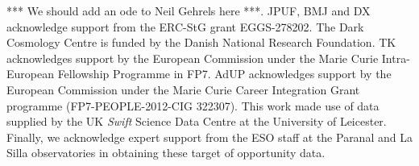 \documentclass{aa}    %
\begin{document}
\begin{acknowledgements}
*** We should add an ode to Neil Gehrels here ***.
JPUF, BMJ and DX acknowledge support from the ERC-StG grant EGGS-278202.  The
Dark Cosmology Centre is funded by the Danish National Research Foundation.  TK
acknowledges support by the European Commission under the Marie Curie
Intra-European Fellowship Programme in FP7.  AdUP acknowledges support by the
European Commission under the Marie Curie Career Integration Grant programme
(FP7-PEOPLE-2012-CIG 322307).  This work made use of data supplied by the UK
{\it Swift} Science Data Centre at the University of Leicester.  Finally, we
acknowledge expert support from the ESO staff at the Paranal and La Silla
observatories in obtaining these target of opportunity data.

\end{acknowledgements}




\newpage
\appendix


\end{document}
